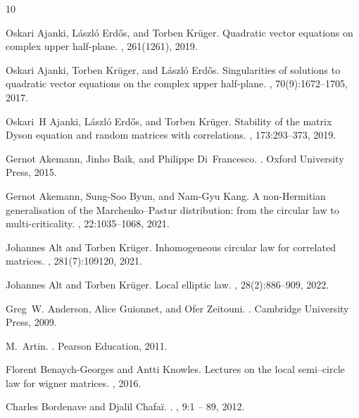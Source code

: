 \documentclass[11pt, a4paper, oneside]{book}
\numberwithin{equation}{chapter}
\begin{document}
\begin{thebibliography}{10}

Oskari Ajanki, L{\'a}szl{\'o} Erd{\H{o}}s, and Torben Kr{\"u}ger.
\newblock Quadratic vector equations on complex upper half-plane.
, 261(1261), 2019.

Oskari Ajanki, Torben Kr{\"u}ger, and L{\'a}szl{\'o} Erd{\H{o}}s.
\newblock Singularities of solutions to quadratic vector equations on the complex upper half-plane.
, 70(9):1672--1705, 2017.

Oskari~H Ajanki, L{\'a}szl{\'o} Erd{\H{o}}s, and Torben Kr{\"u}ger.
\newblock Stability of the matrix {D}yson equation and random matrices with correlations.
, 173:293--373, 2019.

Gernot Akemann, Jinho Baik, and Philippe Di~Francesco.
.
\newblock Oxford University Press, 2015.

Gernot Akemann, Sung-Soo Byun, and Nam-Gyu Kang.
\newblock A non-{H}ermitian generalisation of the {M}archenko--{P}astur distribution: from the circular law to multi-criticality.
, 22:1035--1068, 2021.

Johannes Alt and Torben Kr{\"u}ger.
\newblock Inhomogeneous circular law for correlated matrices.
, 281(7):109120, 2021.

Johannes Alt and Torben Kr{\"u}ger.
\newblock Local elliptic law.
, 28(2):886--909, 2022.

Greg~W. Anderson, Alice Guionnet, and Ofer Zeitouni.
.
\newblock Cambridge University Press, 2009.

M.~Artin.
.
\newblock Pearson Education, 2011.

Florent Benaych-Georges and Antti Knowles.
\newblock Lectures on the local semi--circle law for wigner matrices.
, 2016.

Charles Bordenave and Djalil Chafa{\"i}.
.
, 9:1 -- 89, 2012.


\end{thebibliography}
\end{document}

